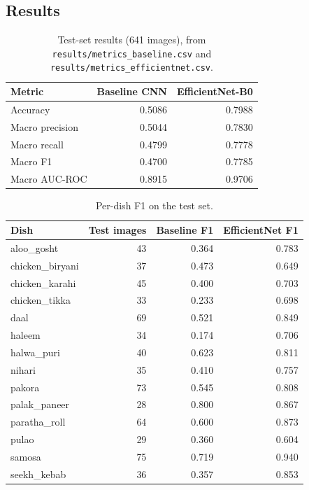 \subsection{Results}
\begin{table}[H]
  \centering
  \begin{tabular}{|l|r|r|}
    \hline
    \textbf{Metric} & \textbf{Baseline CNN} & \textbf{EfficientNet-B0} \\ \hline
    Accuracy        & 0.5086 & 0.7988 \\ \hline
    Macro precision & 0.5044 & 0.7830 \\ \hline
    Macro recall    & 0.4799 & 0.7778 \\ \hline
    Macro F1        & 0.4700 & 0.7785 \\ \hline
    Macro AUC-ROC   & 0.8915 & 0.9706 \\ \hline
  \end{tabular}
  \caption{Test-set results (641 images), from
  \texttt{results/metrics\_baseline.csv} and
  \texttt{results/metrics\_efficientnet.csv}.}
\end{table}

\begin{table}[H]
  \centering
  \begin{tabular}{|l|r|r|r|}
    \hline
    \textbf{Dish} & \textbf{Test images} & \textbf{Baseline F1} & \textbf{EfficientNet F1} \\ \hline
    aloo\_gosht      & 43 & 0.364 & 0.783 \\ \hline
    chicken\_biryani & 37 & 0.473 & 0.649 \\ \hline
    chicken\_karahi  & 45 & 0.400 & 0.703 \\ \hline
    chicken\_tikka   & 33 & 0.233 & 0.698 \\ \hline
    daal             & 69 & 0.521 & 0.849 \\ \hline
    haleem           & 34 & 0.174 & 0.706 \\ \hline
    halwa\_puri      & 40 & 0.623 & 0.811 \\ \hline
    nihari           & 35 & 0.410 & 0.757 \\ \hline
    pakora           & 73 & 0.545 & 0.808 \\ \hline
    palak\_paneer    & 28 & 0.800 & 0.867 \\ \hline
    paratha\_roll    & 64 & 0.600 & 0.873 \\ \hline
    pulao            & 29 & 0.360 & 0.604 \\ \hline
    samosa           & 75 & 0.719 & 0.940 \\ \hline
    seekh\_kebab     & 36 & 0.357 & 0.853 \\ \hline
  \end{tabular}
  \caption{Per-dish F1 on the test set.}
  \label{tab:f1}
\end{table}


